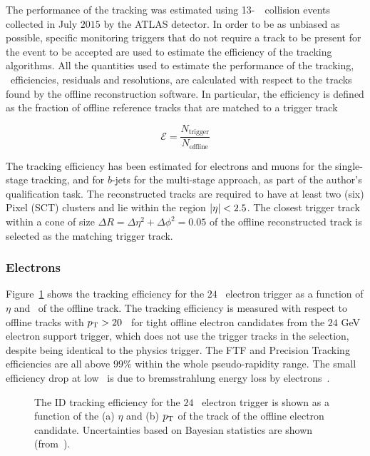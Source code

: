				The performance of the tracking was estimated using 13-\TeV\ \pp\ collision events collected in July $2015$ by the \ac{ATLAS} detector. In order to be as unbiased as possible, specific monitoring triggers that do not require a track to be present for the event to be accepted are used to estimate the efficiency of the tracking algorithms. All the quantities used to estimate the performance of the tracking, \ie\ efficiencies, residuals and resolutions, are calculated with respect to the tracks found by the offline reconstruction software. In particular, the efficiency is defined as the fraction of offline reference tracks that are matched to a trigger track 

				\begin{equation}
					\mathcal{E} = \frac{N_{\mathrm{trigger}}}{N_{\mathrm{offline}}}
					\label{eq:trig_eff}
				\end{equation}

				The tracking efficiency has been estimated for electrons and muons for the single-stage tracking, and for $b$-jets for the multi-stage approach, as part of the author's qualification task. The reconstructed tracks are required to have at least two (six) Pixel (\ac{SCT}) clusters and lie within the region $|\eta| < 2.5$. The closest trigger track within a cone of size $\Delta R =  \Delta \eta^2 + \Delta \phi^2 = 0.05$ of the offline reconstructed track is selected as the matching trigger track.


				\subsubsection*{Electrons}

					Figure~\ref{fig:ele_idtrig_eff} shows the tracking efficiency for the $24$ \GeV\ electron trigger as a function of $\eta$ and \pt\ of the offline track. The tracking efficiency is measured with respect to offline tracks with $p_{\mathrm{T}} > 20$ \GeV\ for tight offline electron candidates from the $24$ GeV electron support trigger, which does not use the trigger tracks in the selection, despite being identical to the physics trigger. The \ac{FTF} and Precision Tracking efficiencies are all above $99\%$ within the whole pseudo-rapidity range. The small efficiency drop at low \pt\ is due to bremsstrahlung energy loss by electrons~\cite{ATLASTrigger2015}.

					\begin{figure}[!htb]
						\begin{center}
							\hspace{0.05\textwidth}
							\hspace{0.05\textwidth}
						\end{center}
						\caption{The ID tracking efficiency for the $24$ \GeV\ electron trigger is shown as a function of the (a) $\eta$ and (b) $p_{\mathrm{T}}$ of the track of the offline electron candidate. Uncertainties based on Bayesian statistics are shown (from~\cite{ATLASTrigger2015}).}
						\label{fig:ele_idtrig_eff}
					\end{figure}


